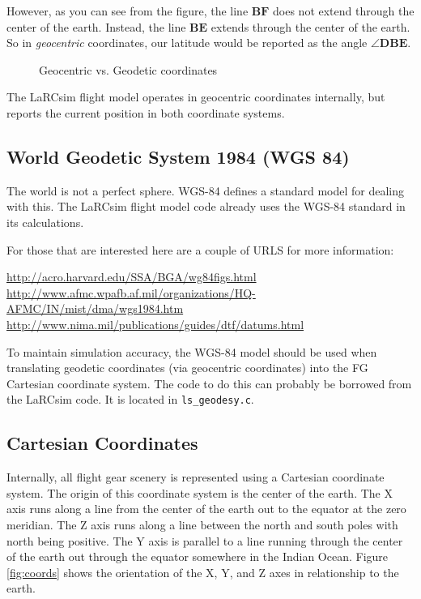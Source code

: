 \documentclass[12pt]{article}
\begin{document}
However, as you can see from the figure, the line $\mathbf{BF}$ does
not extend through the center of the earth.  Instead, the line
$\mathbf{BE}$ extends through the center of the earth.  So in
\textit{geocentric} coordinates, our latitude would be reported as the
angle $\angle \mathbf{DBE}$.

\begin{figure}[hbt]
  \centerline{                   
  }
  \caption{Geocentric vs. Geodetic coordinates}
  \label{fig:geodesy}
\end{figure}

The LaRCsim flight model operates in geocentric coordinates
internally, but reports the current position in both coordinate
systems.

\subsection{World Geodetic System 1984 (WGS 84)}

The world is not a perfect sphere.  WGS-84 defines a standard model
for dealing with this.  The LaRCsim flight model code already uses the
WGS-84 standard in its calculations.

For those that are interested here are a couple of URLS for more
information:

\noindent
\url{http://acro.harvard.edu/SSA/BGA/wg84figs.html} \\
\url{http://www.afmc.wpafb.af.mil/organizations/HQ-AFMC/IN/mist/dma/wgs1984.htm}
\\
\url{http://www.nima.mil/publications/guides/dtf/datums.html}

To maintain simulation accuracy, the WGS-84 model should be used when
translating geodetic coordinates (via geocentric coordinates) into the
FG Cartesian coordinate system.  The code to do this can probably be
borrowed from the LaRCsim code.  It is located in
\texttt{ls\_geodesy.c}.

\subsection{Cartesian Coordinates}

Internally, all flight gear scenery is represented using a Cartesian
coordinate system.  The origin of this coordinate system is the center
of the earth.  The X axis runs along a line from the center of the
earth out to the equator at the zero meridian.  The Z axis runs along
a line between the north and south poles with north being positive.
The Y axis is parallel to a line running through the center of the
earth out through the equator somewhere in the Indian Ocean.  Figure
\ref{fig:coords} shows the orientation of the X, Y, and Z axes in
relationship to the earth.
\end{document}
